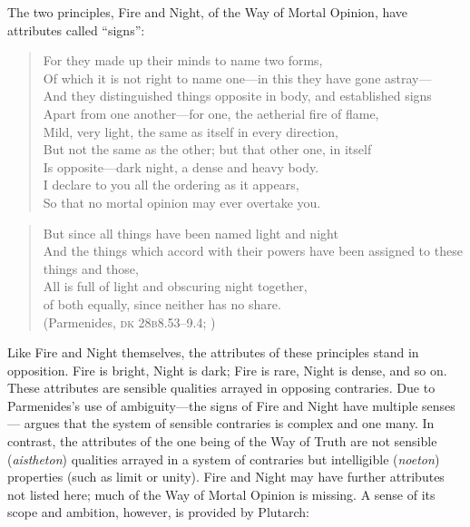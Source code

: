 The two principles, Fire and Night, of the Way of Mortal Opinion, have attributes called ``signs'':
\begin{verse}
    For they made up their minds to name two forms,\\ 
    Of which it is not right to name one---in this they have gone astray---\\
    And they distinguished things opposite in body, and established signs\\
    Apart from one another---for one, the aetherial fire of flame,\\
    Mild, very light, the same as itself in every direction,\\
    But not the same as the other; but that other one, in itself\\
    Is opposite---dark night, a dense and heavy body.\\
    I declare to you all the ordering as it appears,\\
    So that no mortal opinion may ever overtake you.
\end{verse}
\begin{verse}
    But since all things have been named light and night\\
    And the things which accord with their powers have been assigned to these things and those,\\
    All is full of light and obscuring night together,\\
    of both equally, since neither has no share.\\
    (Parmenides, \textsc{dk} 28\textsc{b}8.53--9.4; \citealt[155]{McKirahan:1994ve})
\end{verse}
Like Fire and Night themselves, the attributes of these principles stand in opposition. Fire is bright, Night is dark; Fire is rare, Night is dense, and so on. These attributes are sensible qualities arrayed in opposing contraries. Due to Parmenides's use of ambiguity---the signs of Fire and Night have multiple senses---\citet[244--245]{Mourelatos:2008ve} argues that the system of sensible contraries is complex and one many. In contrast, the attributes of the one being of the Way of Truth are not sensible (\emph{aistheton}) qualities arrayed in a system of contraries but intelligible (\emph{noeton}) properties (such as limit or unity).  Fire and Night may have further attributes not listed here; much of the Way of Mortal Opinion is missing. A sense of its scope and ambition, however, is provided by Plutarch:
